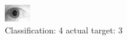 \begin{figure}[h!]
\begin{center}
\includegraphics[width=0.60\columnwidth]{figures/ID1835_class_4_target_3.png}
\end{center}
\caption{ Classification: 4 actual target: 3}
\label{fig:ID1835_class_4_target_3}
\end{figure}
